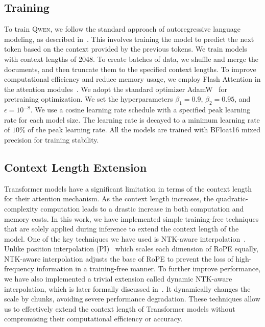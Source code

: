 \subsection{Training}\label{sec:training}
To train \textsc{Qwen}, we follow the standard approach of autoregressive language modeling, as described in~\citet{gpt}. This involves training the model to predict the next token based on the context provided by the previous tokens. We train models with context lengths of \num{2048}. To create batches of data, we shuffle and merge the documents, and then truncate them to the specified context lengths. To improve computational efficiency and reduce memory usage, we employ Flash Attention in the attention modules~\citep{flashattn}. We adopt the standard optimizer AdamW~\citep{adam,adamw} for pretraining optimization. We set the hyperparameters $\beta_1=0.9$, $\beta_2=0.95$, and $\epsilon=10^{-8}$. We use a cosine learning rate schedule with a specified peak learning rate for each model size.  The learning rate is decayed to a minimum learning rate of $10\%$ of the peak learning rate. All the models are trained with BFloat16 mixed precision for training stability. 

\subsection{Context Length Extension} 

Transformer models have a significant limitation in terms of the context length for their attention mechanism. As the context length increases, the quadratic-complexity computation leads to a drastic increase in both computation and memory costs. In this work, we have implemented simple training-free techniques that are solely applied during inference to extend the context length of the model. One of the key techniques we have used is NTK-aware interpolation~\citep{ntk}. Unlike position interpolation (PI)~\citep{position_interpolation} which scales each dimension of RoPE equally, NTK-aware interpolation adjusts the base of RoPE to prevent the loss of high-frequency information in a training-free manner. To further improve performance, we have also implemented a trivial extension called dynamic NTK-aware interpolation, which is later formally discussed in~\citep{yarn}. It dynamically changes the scale by chunks, avoiding severe performance degradation. These techniques allow us to effectively extend the context length of Transformer models without compromising their computational efficiency or accuracy.

